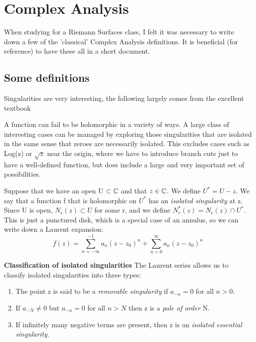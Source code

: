 \section{Complex Analysis}
When studying for a Riemann Surfaces class, I felt it was necessary to write down a few of the 'classical' Complex
Analysis definitions. It is beneficial (for reference) to have these all in a short document.
\subsection{Some definitions}
Singularities are very interesting, the following largely comes from the excellent textbook 
\cite{Shaw_CA_with_Mathematica} 

A function can fail to be holomorphic in a variety of ways. A large class of interesting cases can be managed
by exploring those singularities that are isolated in the same sense that zeroes are necessarily isolated. This
excludes cases such as Log(z) or $\sqrt{z}$ near the origin, where we have to introduce branch cuts just to have
a well-defined function, but does include a large and very important set of possibilities. 
\begin{dfn}
 Suppose that we have an open U $\subset \mathbb{C}$ and that $z \in \mathbb{C}$. We define $U^* = U - {z}$. We say that a 
function f that is holomorphic on $U^*$ has an \textit{isolated singularity} at z. Since U is open, $N_{r}(z) \subset
U$ for some r, and  we define $N_{r}^*(z) = N_r(z) \cap U^*$. This is just a punctured disk, which is a special
case of an annulus, so we can write down a Laurent expansion:
\begin{equation}
 f(z) = \sum_{n=-\infty}^{-1} a_n(z-z_{0})^{n} + \sum_{n=0}^{\infty} a_{n} (z-z_{0})^{n}
\end{equation}

\end{dfn}
\textbf{Classification of isolated singularities}
The Laurent series allows us to classify isolated singularities into three types:
\begin{enumerate}
 \item The point z is said to be a \textit{removable singularity} if $a_{-n} = 0$ for all $n \gt 0$.
\item If $a_{-N}\neq 0$ but $a_{-n}=0$ for all $n \gt N$ then z is a \textit{pole of order} N. 
\item If infinitely many negative terms are present, then z is an \textit{isolated essential singularity.}
\end{enumerate}
